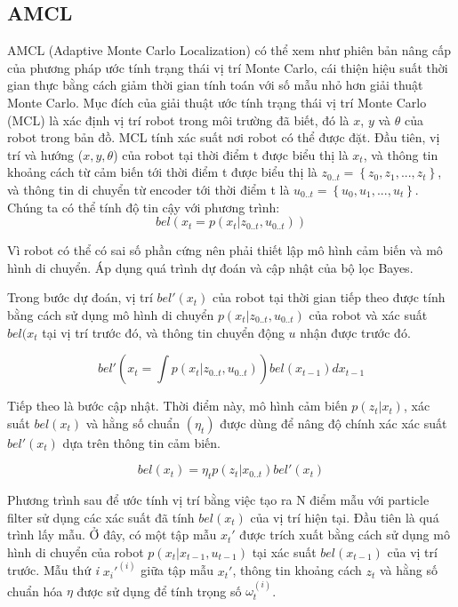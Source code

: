 {{\subsection{AMCL}
AMCL (Adaptive Monte Carlo Localization) có thể xem như phiên bản nâng cấp của phương pháp ước tính trạng thái vị trí Monte Carlo, cái thiện hiệu suất thời gian thực bằng cách giảm thời gian tính toán với số mẫu nhỏ hơn giải thuật Monte Carlo.
Mục đích của giải thuật ước tính trạng thái vị trí Monte Carlo (MCL) là xác định vị trí robot trong môi trường đã biết, đó là $x$, $y$ và $\theta$ của robot trong bản đồ.
MCL tính xác suất nơi robot có thể được đặt. Đầu tiên, vị trí và hướng ($x, y, \theta$) của robot tại thời điểm t được biểu thị là ${x}_{t}$,
và thông tin khoảng cách từ cảm biến tới thời điểm t được biểu thị là ${z}_{0..t} = \left\{{z}_{0}, {z}_{1}, ..., {z}_{t}\right\}$, và thông tin di chuyển từ encoder tới thời điểm t là ${u}_{0..t} = \left\{{u}_{0}, {u}_{1}, ..., {u}_{t}\right\}$. Chúng ta có thể tính độ tin cậy với phương trình:
\begin{equation}
  bel({x}_{t} = p\left({x}_ {t}|{z}_{0..t}, {u}_{0..t}\right))
\end{equation}

Vì robot có thể có sai số phần cứng nên phải thiết lập mô hình cảm biến và mô hình di chuyển. Áp dụng quá trình dự đoán và cập nhật của bộ lọc Bayes.

Trong bước dự đoán, vị trí $bel'\left({x}_{t}\right)$ của robot tại thời gian tiếp theo được tính bằng cách sử dụng mô hình di chuyển $p\left({x}_ {t}|{z}_{0..t}, {u}_{0..t}\right)$ của robot và xác suất $bel({x}_{t}$ tại vị trí trước đó, và thông tin chuyển động $u$ nhận được trước đó.

\begin{equation}
  bel'({x}_{t} = \int p\left({x}_ {t}|{z}_{0..t}, {u}_{0..t}\right))bel\left({x}_{t-1}\right)d{x}_{t-1}
\end{equation}

Tiếp theo là bước cập nhật. Thời điểm này, mô hình cảm biến $p\left({z}_{t}|{x}_{t}\right)$, xác suất $bel\left({x}_{t}\right)$ và hằng số chuẩn $\left({\eta}_{t}\right)$ được dùng để nâng độ chính xác xác suất $bel'\left({x}_{t}\right)$ dựa trên thông tin cảm biến.

\begin{equation}
  bel({x}_{t}) = {\eta}_{t} p\left({z}_ {t}|{x}_{0..t}\right)bel'({x}_{t})
\end{equation}

Phương trình sau để ước tính vị trí bằng việc tạo ra N điểm mẫu với particle filter sử dụng các xác suất đã tính $bel({x}_{t})$ của vị trí hiện tại. Đầu tiên là quá trình lấy mẫu. Ở đây, có một tập mẫu ${x}_{t}'$ được trích xuất bằng cách sử dụng mô hình di chuyển của robot $p\left({x}_{t}|{x}_{t-1}, {u}_{t-1}\right)$ tại xác suất $bel({x}_{t-1})$ của vị trí trước. Mẫu thứ \textit{i} ${{x}_{i}'}^{(i)}$ giữa tập mẫu ${x}_{t}'$, thông tin khoảng cách ${z}_{t}$ và hằng số chuẩn hóa $\eta$ được sử dụng để tính trọng số ${\omega}_{t}^{(i)}$.

}}
